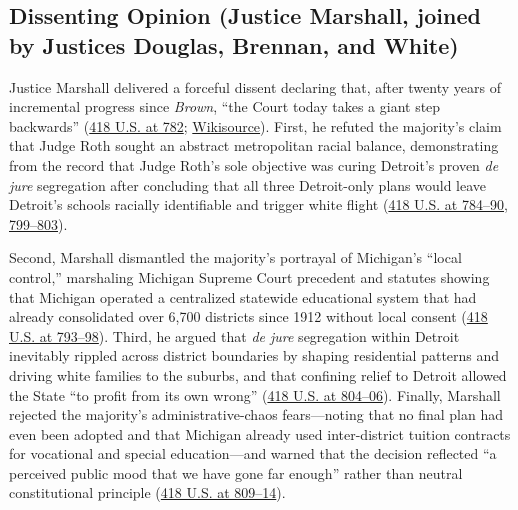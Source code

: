 \documentclass[12pt]{article}
\begin{document}
\subsection{Dissenting Opinion (Justice Marshall, joined by Justices Douglas, Brennan, and White)}
Justice Marshall delivered a forceful dissent declaring that, after twenty years of incremental progress since \textit{Brown}, ``the Court today takes a giant step backwards'' (\href{https://supreme.justia.com/cases/federal/us/418/717/}{418 U.S. at 782}; \href{https://en.wikisource.org/wiki/Milliken_v._Bradley/Dissent_Marshall}{Wikisource}). First, he refuted the majority's claim that Judge Roth sought an abstract metropolitan racial balance, demonstrating from the record that Judge Roth's sole objective was curing Detroit's proven \textit{de jure} segregation after concluding that all three Detroit-only plans would leave Detroit's schools racially identifiable and trigger white flight (\href{https://supreme.justia.com/cases/federal/us/418/717/}{418 U.S. at 784--90, 799--803}).

Second, Marshall dismantled the majority's portrayal of Michigan's ``local control,'' marshaling Michigan Supreme Court precedent and statutes showing that Michigan operated a centralized statewide educational system that had already consolidated over 6,700 districts since 1912 without local consent (\href{https://supreme.justia.com/cases/federal/us/418/717/}{418 U.S. at 793--98}). Third, he argued that \textit{de jure} segregation within Detroit inevitably rippled across district boundaries by shaping residential patterns and driving white families to the suburbs, and that confining relief to Detroit allowed the State ``to profit from its own wrong'' (\href{https://supreme.justia.com/cases/federal/us/418/717/}{418 U.S. at 804--06}). Finally, Marshall rejected the majority's administrative-chaos fears---noting that no final plan had even been adopted and that Michigan already used inter-district tuition contracts for vocational and special education---and warned that the decision reflected ``a perceived public mood that we have gone far enough'' rather than neutral constitutional principle (\href{https://supreme.justia.com/cases/federal/us/418/717/}{418 U.S. at 809--14}).
\end{document}
